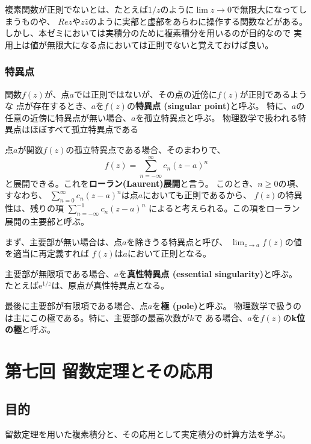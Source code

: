 \documentclass{jarticle}
\newcommand{\e}{\mathrm e}
\begin{document}
複素関数が正則でないとは、たとえば$1/z$のように$\lim z \rightarrow 0$で無限大になってしまうものや、
$Re z$や$z \bar{z}$のように実部と虚部をあらわに操作する関数などがある。
しかし、本ゼミにおいては実積分のために複素積分を用いるのが目的なので
実用上は値が無限大になる点においては正則でないと覚えておけば良い。

\subsubsection{特異点}

関数$f(z)$が、点$a$では正則ではないが、その点の近傍に$f(z)$が正則であるような
点が存在するとき、$a$を$f(z)$の{\bf 特異点 (singular point)}と呼ぶ。
特に、$a$の任意の近傍に特異点が無い場合、$a$を孤立特異点と呼ぶ。
物理数学で扱われる特異点はほぼすべて孤立特異点である

点$a$が関数$f(z)$の孤立特異点である場合、そのまわりで、
\begin{equation}
  f(z) = \sum_{n=-\infty}^{\infty} c_n(z-a)^n
\end{equation}
と展開できる。これを{\bf ローラン(Laurent)展開}と言う。
このとき、$n\ge 0$の項、すなわち、
$\sum_{n=0}^{\infty} c_n(z-a)^n$は点$a$においても正則であるから、
$f(z)$の特異性は、残りの項
$\sum_{n=-\infty}^{-1} c_n(z-a)^n$
によると考えられる。この項をローラン展開の主要部と呼ぶ。

まず、主要部が無い場合は、点$a$を除きうる特異点と呼び、
$\lim_{z\rightarrow a} f(z)$の値を適当に再定義すれば
$f(z)$は$a$において正則となる。

主要部が無限項である場合、$a$を{\bf 真性特異点 (essential singularity)}と呼ぶ。
たとえば$\e^{1/z}$は、原点が真性特異点となる。

最後に主要部が有限項である場合、点$a$を{\bf 極 (pole)}と呼ぶ。
物理数学で扱うのは主にこの極である。特に、主要部の最高次数が$k$で
ある場合、$a$を$f(z)$の{\bf k位の極}と呼ぶ。


\newpage
\section{第七回 留数定理とその応用}

\subsection{目的}

留数定理を用いた複素積分と、その応用として実定積分の計算方法を学ぶ。
\end{document}
